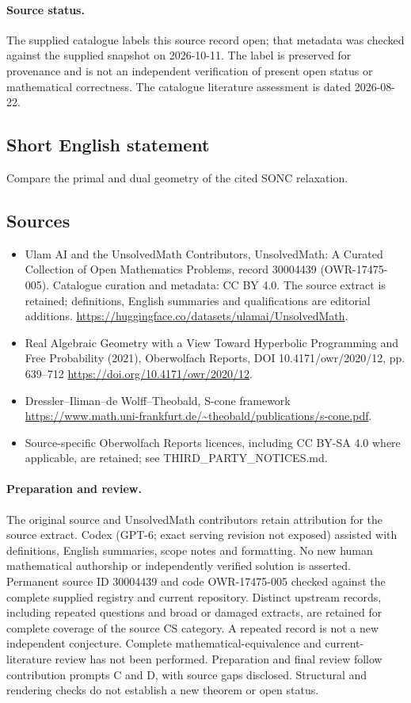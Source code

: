 \documentclass[11pt]{article}
\begin{document}
\paragraph{Source status.}
The supplied catalogue labels this source record open; that metadata was checked against the supplied snapshot on 2026-10-11. The label is preserved for provenance and is not an independent verification of present open status or mathematical correctness. The catalogue literature assessment is dated 2026-08-22.
\subsection{Short English statement}
Compare the primal and dual geometry of the cited SONC relaxation.
\subsection{Sources}
\begin{itemize}
\item[\hypertarget{source:30004439:1}{S1}] Ulam AI and the UnsolvedMath Contributors, UnsolvedMath: A Curated Collection of Open Mathematics Problems, record 30004439 (OWR-17475-005). Catalogue curation and metadata: CC BY 4.0. The source extract is retained; definitions, English summaries and qualifications are editorial additions.
\url{https://huggingface.co/datasets/ulamai/UnsolvedMath}.
\item[\hypertarget{source:30004439:2}{S2}] Real Algebraic Geometry with a View Toward Hyperbolic Programming and Free Probability (2021), Oberwolfach Reports, DOI 10.4171/owr/2020/12, pp. 639--712
\url{https://doi.org/10.4171/owr/2020/12}.
\item[\hypertarget{source:30004439:3}{S3}] Dressler--Iliman--de Wolff--Theobald, S-cone framework
\url{https://www.math.uni-frankfurt.de/~theobald/publications/s-cone.pdf}.
\item Source-specific Oberwolfach Reports licences, including CC BY-SA 4.0 where applicable, are retained; see THIRD\_PARTY\_NOTICES.md.
\end{itemize}
\paragraph{Preparation and review.}
The original source and UnsolvedMath contributors retain attribution for the source extract. Codex (GPT-6; exact serving revision not exposed) assisted with definitions, English summaries, scope notes and formatting. No new human mathematical authorship or independently verified solution is asserted. Permanent source ID 30004439 and code OWR-17475-005 checked against the complete supplied registry and current repository. Distinct upstream records, including repeated questions and broad or damaged extracts, are retained for complete coverage of the source CS category. A repeated record is not a new independent conjecture. Complete mathematical-equivalence and current-literature review has not been performed. Preparation and final review follow contribution prompts C and D, with source gaps disclosed. Structural and rendering checks do not establish a new theorem or open status.
\label{end:30004439}
\end{document}
